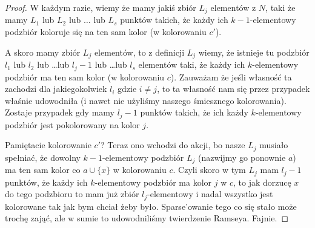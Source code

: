 \begin{proof}
	W każdym razie, wiemy że mamy jakiś zbiór $L_j$ elementów z $N$, taki że mamy $L_1$ lub $L_2$ lub $\dots$ lub $L_s$ punktów takich, że każdy ich $k-1$-elementowy podzbiór koloruje się na ten sam kolor (w kolorowaniu $c'$).

	A skoro mamy zbiór $L_j$ elementów, to z definicji $L_j$ wiemy, że istnieje tu podzbiór $l_1$ lub $l_2$ lub \dots lub $l_j - 1$ lub \dots lub $l_s$ elementów taki, że każdy ich $k$-elementowy podzbiór ma ten sam kolor (w kolorowaniu $c$). Zauważam że jeśli własność ta zachodzi dla jakiegokolwiek $l_i$ gdzie $i \not = j$, to ta własność nam się przez przypadek właśnie udowodniła (i nawet nie użyliśmy naszego śmiesznego kolorowania). Zostaje przypadek gdy mamy $l_j - 1$ punktów takich, że ich każdy $k$-elementowy podzbiór jest pokolorowany na kolor $j$.

	Pamiętacie kolorowanie $c'$? Teraz ono wchodzi do akcji, bo nasze $L_j$ musiało spełniać, że dowolny $k-1$-elementowy podzbiór $L_j$ (nazwijmy go ponownie $a$) ma ten sam kolor co $a \cup \{x\}$ w kolorowaniu $c$. Czyli skoro w tym $L_j$ mam $l_j - 1$ punktów, że każdy ich $k$-elementowy podzbiór ma kolor $j$ w $c$, to jak dorzucę $x$ do tego podzbioru to mam już zbiór $l_j$-elementowy i nadal wszystko jest kolorowane tak jak bym chciał żeby było. Sparse'owanie tego co się stało może trochę zająć, ale w sumie to udowodniliśmy twierdzenie Ramseya. Fajnie.
\end{proof}
